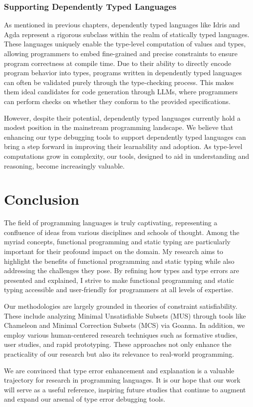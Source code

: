 \subsubsection{Supporting Dependently Typed Languages}

As mentioned in previous chapters, dependently typed languages like Idris and Agda represent a rigorous subclass within the realm of statically typed languages. These languages uniquely enable the type-level computation of values and types, allowing programmers to embed fine-grained and precise constraints to ensure program correctness at compile time. Due to their ability to directly encode program behavior into types, programs written in dependently typed languages can often be validated purely through the type-checking process. This makes them ideal candidates for code generation through LLMs, where programmers can perform checks on whether they conform to the provided specifications. 

However, despite their potential, dependently typed languages currently hold a modest position in the mainstream programming landscape. We believe that enhancing our type debugging tools to support dependently typed languages can bring a step forward in improving their learnability and adoption. As type-level computations grow in complexity, our tools, designed to aid in understanding and reasoning, become increasingly valuable. 


\section{Conclusion}


The field of programming languages is truly captivating, representing a confluence of ideas from various disciplines and schools of thought. Among the myriad concepts, functional programming and static typing are particularly important for their profound impact on the domain. My research aims to highlight the benefits of functional programming and static typing while also addressing the challenges they pose. By refining how types and type errors are presented and explained, I strive to make functional programming and static typing accessible and user-friendly for programmers at all levels of expertise.

Our methodologies are largely grounded in theories of constraint satisfiability. These include analyzing Minimal Unsatisfiable Subsets (MUS) through tools like Chameleon and Minimal Correction Subsets (MCS) via Goanna. In addition, we employ various human-centered research techniques such as formative studies, user studies, and rapid prototyping. These approaches not only enhance the practicality of our research but also its relevance to real-world programming.

We are convinced that type error enhancement and explanation is a valuable trajectory for research in programming languages. It is our hope that our work will serve as a useful reference, inspiring future studies that continue to augment and expand our arsenal of type error debugging tools.


